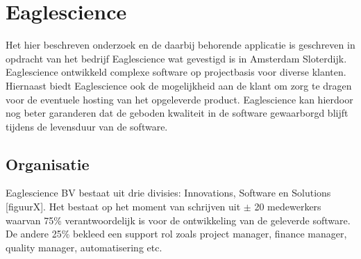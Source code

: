 \chapter{Eaglescience}\label{ch:eaglescience} %

\label{ch:Eaglescience} %

Het hier beschreven onderzoek en de daarbij behorende applicatie is geschreven in opdracht van het bedrijf Eaglescience wat gevestigd is in Amsterdam Sloterdijk.
Eaglescience ontwikkeld complexe software op projectbasis voor diverse klanten.
Hiernaast biedt Eaglescience ook de mogelijkheid aan de klant om zorg te dragen voor de eventuele hosting van het opgeleverde product.
Eaglescience kan hierdoor nog beter garanderen dat de geboden kwaliteit in de software gewaarborgd blijft tijdens de levensduur van de software.

\section{Organisatie}\label{sec:organisatie}

Eaglescience BV bestaat uit drie divisies: Innovations, Software en Solutions [figuurX].%
Het bestaat op het moment van schrijven uit $\pm$ 20 medewerkers waarvan 75\% verantwoordelijk is voor de ontwikkeling van de geleverde software.
De andere 25\% bekleed een support rol zoals project manager, finance manager, quality manager, automatisering etc.

